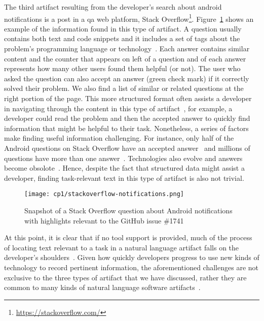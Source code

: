 The third artifact resulting from the developer's search 
about android notifications 
is a post in a \acf{qa} web platform, Stack Overflow\footnote{\url{https://stackoverflow.com/}}.
Figure~\ref{fig:qa-notification-icon} shows an example of the information found in this type of artifact.
A question usually contains both text and code snippets
and it includes a set of tags  about the
problem's programming language or technology~\cite{Treude2011a}. 
Each answer contains similar content and 
the counter that appears on left of a question and of each answer
represents how many other users found them helpful (or not).
The user who asked the question can also accept an answer (green check mark)
if it correctly solved their problem.
We also find a list of similar or related questions 
at the right portion of the page. 
This more structured format often assists a developer 
in navigating through the content in this type of artifact~\cite{nadi2020}, for example, a developer could read the problem and 
then the accepted answer to quickly find information that might be helpful 
to their task. Nonetheless, a series of factors make finding useful information challenging. 
For instance, only half of the Android questions on Stack Overflow
have an accepted answer~\cite{parnin2012} 
and millions of questions have more than one answer~\cite{nadi2020}.
Technologies also evolve and answers become obsolote~\cite{Allamanis2013}.
Hence, despite the fact that structured data  might 
assist a developer, finding task-relevant text in this type of artifact is also not 
trivial.




\begin{figure}
    \centering
    \texttt{[image: cp1/stackoverflow-notifications.png]}
    \caption{Snapshot of a Stack Overflow question about Android notifications  with highlights relevant to the GitHub issue \#1741}
    \label{fig:qa-notification-icon}
\end{figure}



At this point, it is clear that if no tool support is provided, much of the process of locating text 
relevant to a task in a natural language artifact falls on the developer's shoulders~\cite{gonccalves2011, Ko2006a, Bystrom1995}. Given how quickly developers progress to use new kinds of technology to
record pertinent information, the aforementioned challenges are not exclusive 
to the three types of artifact that we have discussed, rather 
they are common to many kinds of natural language software artifacts~\cite{Li2013, Starke2009}.





